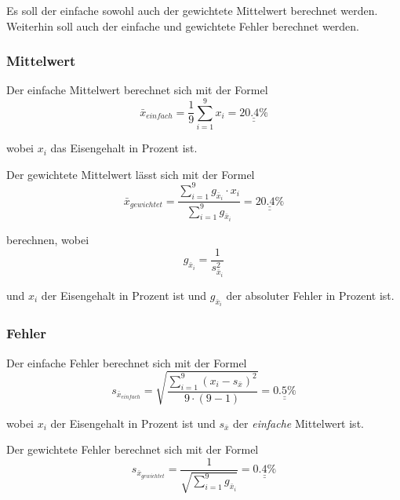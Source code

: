 Es soll der einfache sowohl auch der gewichtete Mittelwert berechnet werden. Weiterhin soll auch
der einfache und gewichtete Fehler berechnet werden.


\subsubsection*{Mittelwert}

Der einfache Mittelwert berechnet sich mit der Formel
\begin{equation}
	\bar{x}_{einfach} = \frac{1}{9} \sum_{i=1}^{9} x_i = \underline{\underline{20.4 \textrm{\%}}}
    \label{eq:einfacher-mittelwert}
\end{equation}

wobei $x_i$ das Eisengehalt in Prozent ist.

Der gewichtete Mittelwert l\"asst sich mit der Formel
\begin{equation}
	\bar{x}_{gewichtet} = \frac{ \sum_{i=1}^{9} g_{\bar{x}_i} \cdot x_i}{ \sum_{i=1}^{9} g_{\bar{x}_i}} = \underline{\underline{20.4 \textrm{\%}}}
    \label{eq:gewichteter-mittelwert}
\end{equation}

berechnen, wobei
\begin{equation}
	g_{\bar{x}_i} = \frac{1}{s_{\bar{x}_i}^2}
    \label{eq:gewicht}
\end{equation}

und $x_i$ der Eisengehalt in Prozent ist und $g_{\bar{x}_i}$ der absoluter Fehler in Prozent ist.


\subsubsection*{Fehler}

Der einfache Fehler berechnet sich mit der Formel
\begin{equation}
	s_{\bar{x}_{einfach}} = \sqrt{ \frac{ \sum_{i=1}^{9} (x_i - s_{\bar{x}})^2}{ 9 \cdot (9-1) }} = \underline{\underline{0.5 \textrm{\%}}}
    \label{eq:einfacher-fehler}
\end{equation}

wobei $x_i$ der Eisengehalt in Prozent ist und $s_{\bar{x}}$ der \emph{einfache} Mittelwert ist.

Der gewichtete Fehler berechnet sich mit der Formel
\begin{equation}
	s_{\bar{x}_{gewichtet}} = \frac{1}{ \sqrt{ \sum_{i=1}^{9} g_{\bar{x}_i} } } = \underline{\underline{0.4 \textrm{\%}}} 
    \label{eq:gewichteter-fehler}
\end{equation}

